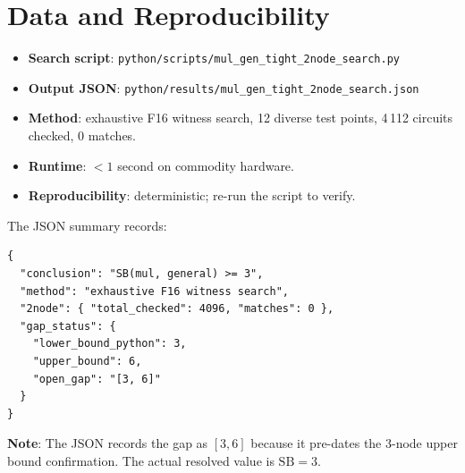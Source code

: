 \documentclass[12pt]{article}
\theoremstyle{definition}
\begin{document}
\section{Data and Reproducibility}

\begin{itemize}
  \item \textbf{Search script}: \texttt{python/scripts/mul\_gen\_tight\_2node\_search.py}
  \item \textbf{Output JSON}: \texttt{python/results/mul\_gen\_tight\_2node\_search.json}
  \item \textbf{Method}: exhaustive F16 witness search, 12 diverse test points,
    4\,112 circuits checked, 0 matches.
  \item \textbf{Runtime}: $< 1$ second on commodity hardware.
  \item \textbf{Reproducibility}: deterministic; re-run the script to verify.
\end{itemize}

The JSON summary records:
\begin{verbatim}
{
  "conclusion": "SB(mul, general) >= 3",
  "method": "exhaustive F16 witness search",
  "2node": { "total_checked": 4096, "matches": 0 },
  "gap_status": {
    "lower_bound_python": 3,
    "upper_bound": 6,
    "open_gap": "[3, 6]"
  }
}
\end{verbatim}

\textbf{Note}: The JSON records the gap as $[3, 6]$ because it pre-dates the
3-node upper bound confirmation.  The actual resolved value is $\mathrm{SB} = 3$.
\end{document}
